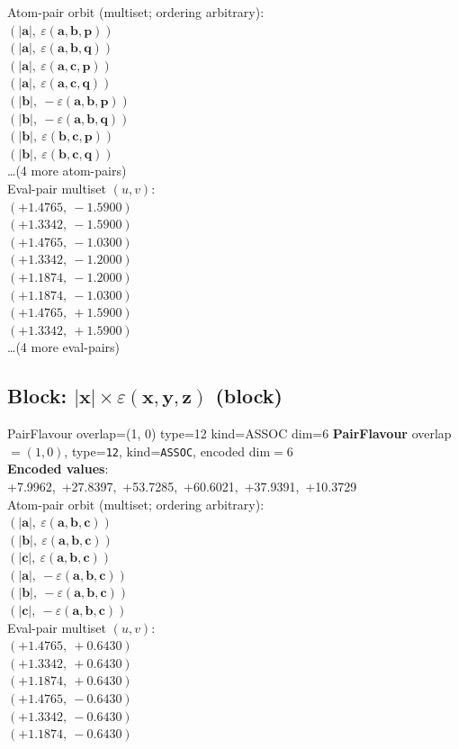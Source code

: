 \documentclass[a4paper,11pt]{article}
\newcommand{\vc}[1]{\ensuremath{\mathbf{#1}}}
\newcommand{\dnfagmiihhiejm}[1]{|\vc{#1}|}
\newcommand{\kblbmcpggoncpf}[3]{\varepsilon(\mathbf{#1},\mathbf{#2},\mathbf{#3})}
\begin{document}
\quad Atom-pair orbit (multiset; ordering arbitrary):\\
$(\dnfagmiihhiejm{a},\ \kblbmcpggoncpf{a}{b}{p})$\\
$(\dnfagmiihhiejm{a},\ \kblbmcpggoncpf{a}{b}{q})$\\
$(\dnfagmiihhiejm{a},\ \kblbmcpggoncpf{a}{c}{p})$\\
$(\dnfagmiihhiejm{a},\ \kblbmcpggoncpf{a}{c}{q})$\\
$(\dnfagmiihhiejm{b},\ -\kblbmcpggoncpf{a}{b}{p})$\\
$(\dnfagmiihhiejm{b},\ -\kblbmcpggoncpf{a}{b}{q})$\\
$(\dnfagmiihhiejm{b},\ \kblbmcpggoncpf{b}{c}{p})$\\
$(\dnfagmiihhiejm{b},\ \kblbmcpggoncpf{b}{c}{q})$\\
\quad \ldots (4 more atom-pairs)\\
\quad Eval-pair multiset $(u, v)$:\\
$(+1.4765,\ -1.5900)$\\
$(+1.3342,\ -1.5900)$\\
$(+1.4765,\ -1.0300)$\\
$(+1.3342,\ -1.2000)$\\
$(+1.1874,\ -1.2000)$\\
$(+1.1874,\ -1.0300)$\\
$(+1.4765,\ +1.5900)$\\
$(+1.3342,\ +1.5900)$\\
\quad \ldots (4 more eval-pairs)\\

\subsection{Block: $\dnfagmiihhiejm{x} \times \kblbmcpggoncpf{x}{y}{z}$  (block)}
    PairFlavour  overlap=(1, 0)  type=12  kind=ASSOC  dim=6
\textbf{PairFlavour} overlap$=(1, 0)$, type=\texttt{12}, kind=\texttt{ASSOC}, encoded dim$=6$\\
\textbf{      Encoded values}: +7.9962,\ +27.8397,\ +53.7285,\ +60.6021,\ +37.9391,\ +10.3729\\
\quad Atom-pair orbit (multiset; ordering arbitrary):\\
$(\dnfagmiihhiejm{a},\ \kblbmcpggoncpf{a}{b}{c})$\\
$(\dnfagmiihhiejm{b},\ \kblbmcpggoncpf{a}{b}{c})$\\
$(\dnfagmiihhiejm{c},\ \kblbmcpggoncpf{a}{b}{c})$\\
$(\dnfagmiihhiejm{a},\ -\kblbmcpggoncpf{a}{b}{c})$\\
$(\dnfagmiihhiejm{b},\ -\kblbmcpggoncpf{a}{b}{c})$\\
$(\dnfagmiihhiejm{c},\ -\kblbmcpggoncpf{a}{b}{c})$\\
\quad Eval-pair multiset $(u, v)$:\\
$(+1.4765,\ +0.6430)$\\
$(+1.3342,\ +0.6430)$\\
$(+1.1874,\ +0.6430)$\\
$(+1.4765,\ -0.6430)$\\
$(+1.3342,\ -0.6430)$\\
$(+1.1874,\ -0.6430)$\\
\end{document}
